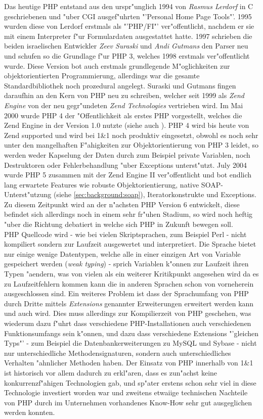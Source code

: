 Das heutige PHP entstand aus den urspr"unglich 1994 von \emph{Rasmus Lerdorf} in C geschriebenen und "uber CGI
ausgef"uhrten "'Personal Home Page Tools"'. 1995 wurden diese von Lerdorf erstmals als "'PHP/FI"' ver"offentlicht,
nachdem er sie mit einem Interpreter f"ur Formulardaten ausgestattet hatte.
1997 schrieben die beiden israelischen Entwickler \emph{Zeev Suraski} und \emph{Andi Gutmans} den Parser neu und
schufen so die Grundlage f"ur PHP 3, welches 1998 erstmals ver"offentlicht wurde. Diese Version bot auch 
erstmals grundlegende M"oglichkeiten zur objektorientierten Programmierung, allerdings war die gesamte 
Standardbibliothek noch prozedural angelegt.
Suraski und Gutmans fingen daraufhin an den Kern von PHP neu zu schreiben, welcher seit 1999 als \emph{Zend Engine}
von der neu gegr"undeten \emph{Zend Technologies} vertrieben wird. Im Mai 2000 wurde PHP 4 der
"Offentlichkeit als erstes PHP vorgestellt, welches die Zend Engine in der Version 1.0 nutzte (siehe auch \cite{ZENDENGINE}).
PHP 4 wird bis heute von Zend supported und wird bei 1\&1 noch produktiv eingesetzt, obwohl es noch sehr unter den
mangelhaften F"ahigkeiten zur Objektorientierung von PHP 3 leidet, so werden weder Kapselung der Daten durch 
zum Beispiel private Variablen, noch Destruktoren oder Fehlerbehandlung "uber Exceptions unterst"utzt.
July 2004 wurde PHP 5 zusammen mit der Zend Engine II ver"offentlicht und bot endlich lang erwartete Features wie
robuste Objektorientierung, native SOAP-Unterst"utzung (siehe \ref{sec:background:soap}), 
Iteratorkonstrukte und Exceptions. Zu diesem Zeitpunkt wird an der n"achsten PHP Version 6 entwickelt, diese
befindet sich allerdings noch in einem sehr fr"uhen Stadium, so wird noch heftig "uber die Richtung
debatiert in welche sich PHP in Zukunft bewegen soll.\\
PHP Quellcode wird - wie bei vielen Skriptsprachen, zum Beispiel Perl - nicht kompiliert sondern zur Laufzeit ausgewertet und interpretiert.
Die Sprache bietet nur einige wenige Datentypen, welche alle in einer einzigen Art von Variable gespeichert werden 
(\emph{weak typing}) - sprich Variablen k"onnen zur Laufzeit ihren Typen "aendern, was von vielen als ein weiterer
Kritikpunkt angesehen wird da es zu Laufzeitfehlern kommen kann die in anderen Sprachen schon von vorneherein 
ausgeschlossen sind. Ein weiteres Problem ist dass der Sprachumfang von PHP durch Dritte mittels \emph{Extensions}
genannter Erweiterungen erweitert werden kann und auch wird. Dies muss allerdings zur Kompilierzeit von PHP geschehen, was wiederum
dazu f"uhrt dass verschiedene PHP-Installationen auch verschiedenen Funktionsumfangs sein k"onnen, und dazu dass
verschiedene Extensions "'gleichen Typs"' - zum Beispiel die Datenbankerweiterungen zu MySQL und Sybase - nicht
nur unterschiedliche Methodensignaturen, sondern auch unterschiedliches Verhalten "ahnlicher Methoden haben.
Der Einsatz von PHP innerhalb von 1\&1 ist historisch vor allem dadurch zu erkl"aren, dass es zun"achst keine 
konkurrenzf"ahigen Technologien gab, und sp"ater erstens schon sehr viel in diese Technologie investiert
worden war und zweitens etwaiige technischen Nachteile von PHP durch im Unternehmen vorhandenes Know-How sehr gut
ausgeglichen werden konnten.

